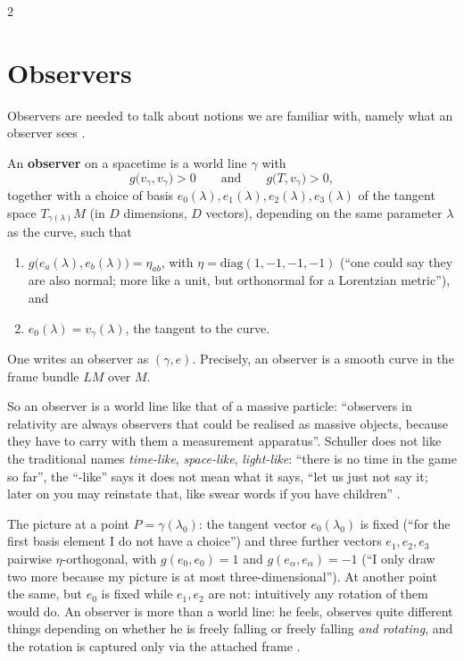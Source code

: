 \begin{paracol}{2}
\section{Observers}\label{sec:c13-observers}

Observers are needed to talk about notions we are familiar with, namely what an observer sees .

\begin{definition}\label{def:c13-observer}
An \textbf{observer} on a spacetime is a world line $\gamma$ with
\[
  g\bigl(v_\gamma,v_\gamma\bigr)>0\qquad\text{and}\qquad g\bigl(T,v_\gamma\bigr)>0,
\]
together with a choice of basis $e_0(\lambda),e_1(\lambda),e_2(\lambda),e_3(\lambda)$ of the tangent space $T_{\gamma(\lambda)}M$ (in $D$ dimensions, $D$ vectors), depending on the same parameter $\lambda$ as the curve, such that
\begin{enumerate}
  \item $g\bigl(e_a(\lambda),e_b(\lambda)\bigr)=\eta_{ab}$, with $\eta=\mathrm{diag}(1,-1,-1,-1)$ (``one could say they are also normal; more like a unit, but orthonormal for a Lorentzian metric''), and
  \item $e_0(\lambda)=v_\gamma(\lambda)$, the tangent to the curve.
\end{enumerate}
One writes an observer as $(\gamma,e)$. Precisely, an observer is a smooth curve in the frame bundle $LM$ over $M$.
\end{definition}
So an observer is a world line like that of a massive particle: ``observers in relativity are always observers that could be realised as massive objects, because they have to carry with them a measurement apparatus''. Schuller does not like the traditional names \emph{time-like}, \emph{space-like}, \emph{light-like}: ``there is no time in the game so far'', the ``-like'' says it does not mean what it says, ``let us just not say it; later on you may reinstate that, like swear words if you have children'' .

The picture at a point $P=\gamma(\lambda_0)$: the tangent vector $e_0(\lambda_0)$ is fixed (``for the first basis element I do not have a choice'') and three further vectors $e_1,e_2,e_3$ pairwise $\eta$-orthogonal, with $g(e_0,e_0)=1$ and $g(e_\alpha,e_\alpha)=-1$ (``I only draw two more because my picture is at most three-dimensional''). At another point the same, but $e_0$ is fixed while $e_1,e_2$ are not: intuitively any rotation of them would do. An observer is more than a world line: he feels, observes quite different things depending on whether he is freely falling or freely falling \emph{and rotating}, and the rotation is captured only via the attached frame .


\end{paracol}
